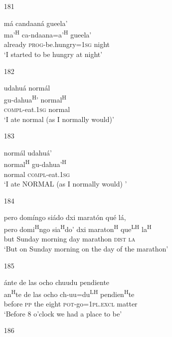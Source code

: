 \begin{itemize}
\item[181]
 
\glll m\'{a} candaan\'{a} gueela'\\
ma'\textsuperscript{H} ca-ndaana=a'\textsuperscript{H} gueela'\\
already \textsc{prog}-be.hungry=\textsc{1sg} night\\
\glt `I started to be hungry at night'



\item[182] 

\glll udahu\'{a} norm\'{a}l\\
 gu-dahua\textsuperscript{H}' normal\textsuperscript{H}\\
\textsc{compl}-eat.\textsc{1sg} normal \\
\glt `I ate normal (as I normally would)'


\item[183] 

\glll norm\'{a}l udahu\'{a}'\\
normal\textsuperscript{H} gu-dahua'\textsuperscript{H}\\
normal \textsc{compl}-eat.\textsc{1sg}\\
\glt `I ate NORMAL (as I normally would) '




\item[184]
 
\glll   pero dom\'{i}ngo si\'{a}do dxi marat\'{o}n qu\'{e} l\'{a}, \\
pero domi\textsuperscript{H}ngo sia\textsuperscript{H}do' dxi maraton\textsuperscript{H} que\textsuperscript{LH} la\textsuperscript{H}\\
but Sunday morning day marathon \textsc{dist} \textsc{la}\\
\glt `But on Sunday morning on the day of the marathon'
 


\item[185]
 
\glll  \'{a}nte de las ocho chuudu pendiente\\
an\textsuperscript{H}te de las ocho ch-uu=du\textsuperscript{LH} pendien\textsuperscript{H}te\\
before \textsc{pp} the eight \textsc{pot}-go=\textsc{1pl.excl} matter\\
\glt `Before 8 o'clock we had a place to be'
 


\item[186]


\end{itemize}
